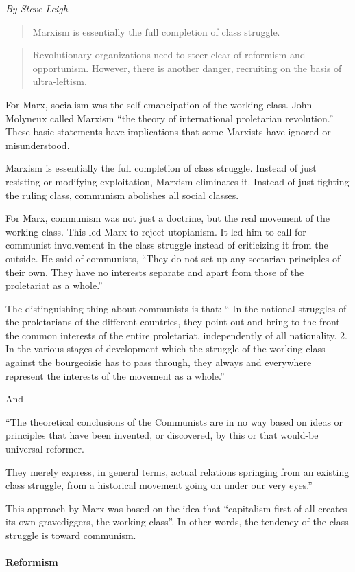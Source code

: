 \emph{By Steve Leigh}

\blockquote{Marxism is essentially the full completion of class struggle.}

\blockquote{Revolutionary organizations need to steer clear of reformism and opportunism. However, there is another danger, recruiting on the basis of ultra-leftism.}

For Marx, socialism was the self-emancipation of the working class. John Molyneux called Marxism ``the theory of international proletarian revolution.'' These basic statements have implications that some Marxists have ignored or misunderstood.

Marxism is essentially the full completion of class struggle. Instead of just resisting or modifying exploitation, Marxism eliminates it. Instead of just fighting the ruling class, communism abolishes all social classes.

For Marx, communism was not just a doctrine, but the real movement of the working class. This led Marx to reject utopianism. It led him to call for communist involvement in the class struggle instead of criticizing it from the outside. He said of communists, ``They do not set up any sectarian principles of their own. They have no interests separate and apart from those of the proletariat as a whole.''

The distinguishing thing about communists is that: `` In the national struggles of the proletarians of the different countries, they point out and bring to the front the common interests of the entire proletariat, independently of all nationality. 2. In the various stages of development which the struggle of the working class against the bourgeoisie has to pass through, they always and everywhere represent the interests of the movement as a whole.''

And

``The theoretical conclusions of the Communists are in no way based on ideas or principles that have been invented, or discovered, by this or that would-be universal reformer.

They merely express, in general terms, actual relations springing from an existing class struggle, from a historical movement going on under our very eyes.''

This approach by Marx was based on the idea that ``capitalism first of all creates its own gravediggers, the working class''. In other words, the tendency of the class struggle is toward communism.

\paragraph{Reformism}

